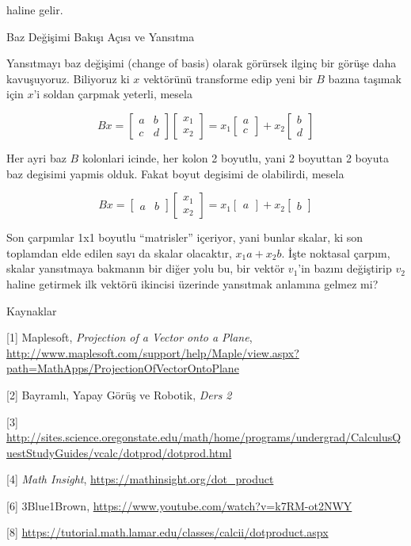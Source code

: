 \documentclass[12pt,fleqn]{article}\usepackage{../../common}
\begin{document}
haline gelir.

Baz Değişimi Bakışı Açısı ve Yansıtma

Yansıtmayı baz değişimi (change of basis) olarak görürsek ilginç bir görüşe daha
kavuşuyoruz. Biliyoruz ki $x$ vektörünü transforme edip yeni bir $B$ bazına
taşımak için $x$'i soldan çarpmak yeterli, mesela

$$
Bx = 
\left[\begin{array}{ccc}
a & b \\ c & d
\end{array}\right]
\left[\begin{array}{c}
x_1 \\ x_2
\end{array}\right] =
x_1 \left[\begin{array}{c}
a \\ c
\end{array}\right] +
x_2 \left[\begin{array}{c}
b \\ d
\end{array}\right]
$$

Her ayri baz $B$ kolonlari icinde, her kolon 2 boyutlu, yani 2 boyuttan 2 boyuta
baz degisimi yapmis olduk. Fakat boyut degisimi de olabilirdi, mesela 

$$
Bx = 
\left[\begin{array}{ccc}
a & b 
\end{array}\right]
\left[\begin{array}{c}
x_1 \\ x_2
\end{array}\right] =
x_1 \left[\begin{array}{c}
a 
\end{array}\right] +
x_2 \left[\begin{array}{c}
b 
\end{array}\right]
$$

Son çarpımlar 1x1 boyutlu ``matrisler'' içeriyor, yani bunlar skalar, ki son
toplamdan elde edilen sayı da skalar olacaktır, $x_1 a + x_2 b$. İşte noktasal
çarpım, skalar yansıtmaya bakmanın bir diğer yolu bu, bir vektör $v_1$'in bazını
değiştirip $v_2$ haline getirmek ilk vektörü ikincisi üzerinde yansıtmak
anlamına gelmez mi? 

Kaynaklar

[1] Maplesoft, {\em Projection of a Vector onto a Plane}, \url{http://www.maplesoft.com/support/help/Maple/view.aspx?path=MathApps/ProjectionOfVectorOntoPlane}

[2] Bayramlı, Yapay Görüş ve Robotik, {\em Ders 2}

[3] \url{http://sites.science.oregonstate.edu/math/home/programs/undergrad/CalculusQuestStudyGuides/vcalc/dotprod/dotprod.html}

[4] {\em Math Insight},
    \url{https://mathinsight.org/dot_product}

[6] 3Blue1Brown, \url{https://www.youtube.com/watch?v=k7RM-ot2NWY}

[8] \url{https://tutorial.math.lamar.edu/classes/calcii/dotproduct.aspx}
\end{document}
